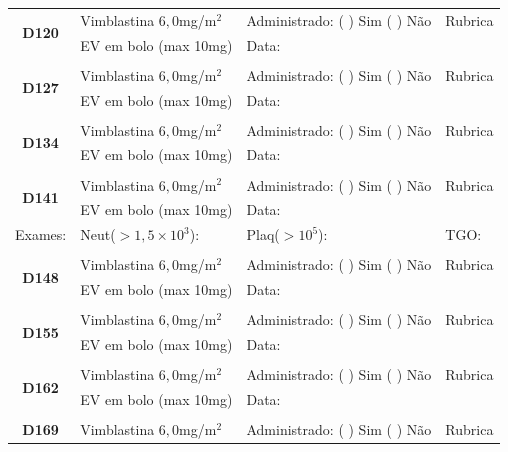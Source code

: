 \documentclass[11pt,a4paper,oldfontcommands]{memoir}
\begin{document}
\begin{center}
\begin{table}[H]
\begin{tabular}{p{}p{}|p{}|p{3cm}}
    \hline
    \multicolumn{1}{c|}{\multirow{2}{*}{\textbf{D120}}}&{Vimblastina \(6,0\)mg/m\(^2\)}&{Administrado: (  ) Sim (  ) Não}&{Rubrica}\\
    \multicolumn{1}{c|}{}&{EV em bolo (max 10mg)}&{Data:}&\\
    \hline\\
    \hline
    \multicolumn{1}{c|}{\multirow{2}{*}{\textbf{D127}}}&{Vimblastina \(6,0\)mg/m\(^2\)}&{Administrado: (  ) Sim (  ) Não}&{Rubrica}\\
    \multicolumn{1}{c|}{}&{EV em bolo (max 10mg)}&{Data:}&\\
    \hline
    \\
    \hline
    \multicolumn{1}{c|}{\multirow{2}{*}{\textbf{D134}}}&{Vimblastina \(6,0\)mg/m\(^2\)}&{Administrado: (  ) Sim (  ) Não}&{Rubrica}\\
    \multicolumn{1}{c|}{}&{EV em bolo (max 10mg)}&{Data:}&\\
    \hline
    \\
    \hline
    \multicolumn{1}{c|}{\multirow{2}{*}{\textbf{D141}}}&{Vimblastina \(6,0\)mg/m\(^2\)}&{Administrado: (  ) Sim (  ) Não}&{Rubrica}\\
    \multicolumn{1}{c|}{}&{EV em bolo (max 10mg)}&{Data:}&\\
    \hline
    {Exames:}&{Neut(\(>1,5\times10^3\)):}&{Plaq(\(>10^5\)):}&{TGO:}
    \\
    \hline
    \\
    \hline
    \multicolumn{1}{c|}{\multirow{2}{*}{\textbf{D148}}}&{Vimblastina \(6,0\)mg/m\(^2\)}&{Administrado: (  ) Sim (  ) Não}&{Rubrica}\\
    \multicolumn{1}{c|}{}&{EV em bolo (max 10mg)}&{Data:}&\\
    \hline
    \\
    \hline
    \multicolumn{1}{c|}{\multirow{2}{*}{\textbf{D155}}}&{Vimblastina \(6,0\)mg/m\(^2\)}&{Administrado: (  ) Sim (  ) Não}&{Rubrica}\\
    \multicolumn{1}{c|}{}&{EV em bolo (max 10mg)}&{Data:}&\\
    \hline
    \\
    \hline
    \multicolumn{1}{c|}{\multirow{2}{*}{\textbf{D162}}}&{Vimblastina \(6,0\)mg/m\(^2\)}&{Administrado: (  ) Sim (  ) Não}&{Rubrica}\\
    \multicolumn{1}{c|}{}&{EV em bolo (max 10mg)}&{Data:}&\\
    \hline
    \\
    \hline
    \multicolumn{1}{c|}{\multirow{2}{*}{\textbf{D169}}}&{Vimblastina \(6,0\)mg/m\(^2\)}&{Administrado: (  ) Sim (  ) Não}&{Rubrica}\\

\end{tabular}
\end{table}
\end{center}
\end{document}
